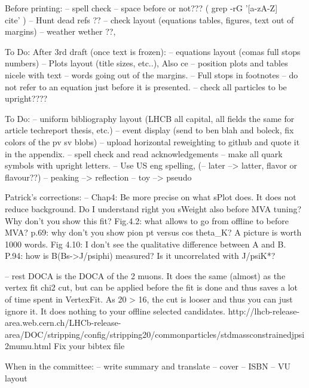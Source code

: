 Before printing:
-- spell check
-- space before \cite{} or not??? ( grep -rG  '[a-zA-Z]\\cite' )
-- Hunt dead refs ??
-- check layout (equations tables, figures, text out of margins)
-- weather wether ??,

To Do: After 3rd draft (once text is frozen):
-- equations layout (comas full stops numbers)
-- Plots layout (title sizes, etc..), Also ce
-- position plots and tables nicele with text
-- words going out of the margins.
-- Full stops in footnotes
-- do not refer to an equation just before it is presented.
-- check all particles to be upright????


To Do:
-- uniform bibliography layout (LHCB all capital, all fields the same for article techreport thesis, etc.)
-- event display (send to ben blah and boleck, fix colors of the pv sv blobs)
-- upload horizontal reweighting to github and quote it in the appendix.
-- spell check and read acknowledgements
-- make all quark symbols with upright letters.
-- Use US eng spelling, (-- later --> latter, flavor or flavour??)
-- peaking --> reflection
-- toy --> pseudo

Patrick's corrections:
-- Chap4:
Be more precise on what sPlot does. It does not reduce background.
Do I understand right you sWeight also before MVA tuning? Why don't you show this fit?
Fig.4.2: what allows to go from offline to before MVA?
p.69: why don't you show pion pt versus cos theta_K? A picture is worth 1000 words.
Fig 4.10: I don't see the qualitative difference between A and B.
P.94: how is B(Bs->J/psiphi) measured? Is it uncorrelated with J/psiK*?

-- rest
DOCA is the DOCA of the 2 muons. It does the same (almost) as the vertex fit chi2 cut, but can be applied before the fit is done and thus saves a lot of time spent in VertexFit. As 20 > 16, the cut is looser and thus you can just ignore it. It does nothing to your offline selected candidates. http://lhcb-release-area.web.cern.ch/LHCb-release-area/DOC/stripping/config/stripping20/commonparticles/stdmassconstrainedjpsi2mumu.html
Fix your bibtex file

When in the committee:
-- write summary and translate
-- cover
-- ISBN
-- VU layout
